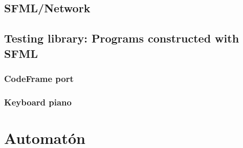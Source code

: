 \documentclass[latterpaper, leqno]{article}
\begin{document}
\subsection{SFML/Network}
\subsection{Testing library: Programs constructed with SFML}
\subsubsection*{CodeFrame port}
\subsubsection*{Keyboard piano}

\section{Automatón}
\end{document}

